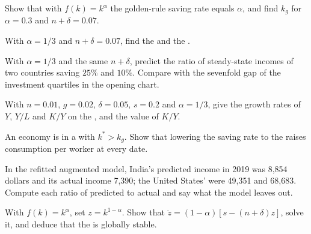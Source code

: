 \begin{exercise}[$\star$]\label{exo:b1:solow-model:golden-ex}
Show that with $f(k) = k^{\alpha}$ the golden-rule saving rate equals $\alpha$, and find
$k_g$ for $\alpha = 0.3$ and $n + \delta = 0.07$.
\end{exercise}

\begin{exercise}[$\star\star$]\label{exo:b1:solow-model:half}
With $\alpha = 1/3$ and $n + \delta = 0.07$, find the  and the .
\end{exercise}

\begin{exercise}[$\star\star$]\label{exo:b1:solow-model:ratio}
With $\alpha = 1/3$ and the same $n + \delta$, predict the ratio of steady-state incomes of
two countries saving $25\%$ and $10\%$. Compare with the sevenfold gap of the
investment quartiles in the opening chart.
\end{exercise}

\begin{exercise}[$\star\star$]\label{exo:b1:solow-model:balanced-ex}
With $n = 0.01$, $g = 0.02$, $\delta = 0.05$, $s = 0.2$ and $\alpha = 1/3$, give the growth rates of $Y$,
$Y/L$ and $K/Y$ on the , and the value of $K/Y$.
\end{exercise}

\begin{exercise}[$\star\star$]\label{exo:b1:solow-model:inefficient}
An economy is in a  with $k^* > k_g$. Show that lowering the saving
rate to the  raises consumption per worker at every date.
\end{exercise}

\begin{exercise}[$\star\star$]\label{exo:b1:solow-model:fit}
In the refitted augmented model, India's predicted income in 2019 was
8,854 dollars and its actual income 7,390; the United States' were 49,351
and 68,683. %
Compute each ratio of predicted to actual and say what the model leaves
out.
\end{exercise}

\begin{exercise}[$\star\star\star$]\label{exo:b1:solow-model:exact}
With $f(k) = k^{\alpha}$, set $z = k^{1 - \alpha}$. Show that $\dot z = (1 - \alpha)[s - (n + \delta)z]$, solve
it, and deduce that the  is globally stable.
\end{exercise}

